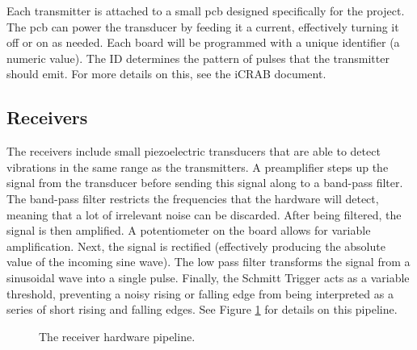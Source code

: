 \documentclass[12pt]{article}
\begin{document}
Each transmitter is attached to a small \gls{pcb} designed
specifically for the project.
The \gls{pcb} can power the transducer by feeding it a current, effectively
turning it off or on as needed.
Each board will be programmed with a unique identifier (a numeric value).
The ID determines the pattern of pulses that the transmitter should emit.
For more details on this, see the \gls{iCRAB} document.

\subsection{Receivers}

The receivers include small piezoelectric transducers that are able to detect
vibrations in the same range as the transmitters.
A preamplifier steps up the signal from the transducer before sending this
signal along to a band-pass filter.
The band-pass filter restricts the frequencies that the hardware will
detect, meaning that a lot of irrelevant noise can be discarded.
After being filtered, the signal is then amplified.
A potentiometer on the board allows for variable amplification.
Next, the signal is
rectified (effectively producing the absolute value of the incoming sine wave).
The low pass filter transforms the signal from a sinusoidal wave into a single
pulse.
Finally, the Schmitt Trigger acts as a variable threshold, preventing a noisy
rising or falling edge from being interpreted as a series of short rising and
falling edges.
See Figure \ref{fig:rx-detail} for details on this pipeline.

\begin{figure}[h]
\begin{center}
\end{center}
\caption{The receiver hardware pipeline.}
\label{fig:rx-detail}
\end{figure}
\end{document}
